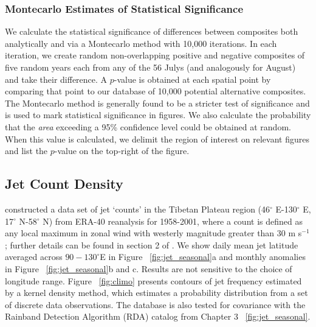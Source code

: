 \subsubsection{Montecarlo Estimates of Statistical Significance}	
	
	We calculate the statistical significance of differences between composites both analytically and via a Montecarlo method with 10,000 iterations. In each iteration, we create random non-overlapping positive and negative composites of five random years each from any of the 56 Julys (and analogously for August) and take their difference. A $p$-value is obtained at each spatial point by comparing that point to our database of 10,000 potential alternative composites. The Montecarlo method is generally found to be a stricter test of significance and is used to mark statistical significance in figures. We also calculate the probability that the \textit{area} exceeding a 95\% confidence level could be obtained at random. When this value is calculated, we delimit the region of interest on relevant figures and list the $p$-value on the top-right of the figure.
	





\subsection{Jet Count Density} 

	\citet{Schiemann2009} constructed a data set of jet `counts' in the Tibetan Plateau region (46$^{\circ}$ E-130$^{\circ}$ E, 17$^{\circ}$ N-58$^{\circ}$ N) from ERA-40 reanalysis for 1958-2001, where a count is defined as any local maximum in zonal wind with westerly magnitude greater than $30$ m s$^{-1}$; further details can be found in section 2 of \citet{Schiemann2009}. We show daily mean jet latitude averaged across $90-130^\circ$E in Figure ~\ref{fig:jet_seasonal}a and monthly anomalies in Figure ~\ref{fig:jet_seasonal}b and c. Results are not sensitive to the choice of longitude range. Figure ~\ref{fig:climo} presents contours of jet frequency estimated by a kernel density method, which estimates a probability distribution from a set of discrete data observations. The \citet{Schiemann2009} database is also tested for covariance with the Rainband Detection Algorithm (RDA) catalog from Chapter 3 ~\ref{fig:jet_seasonal}.
	
